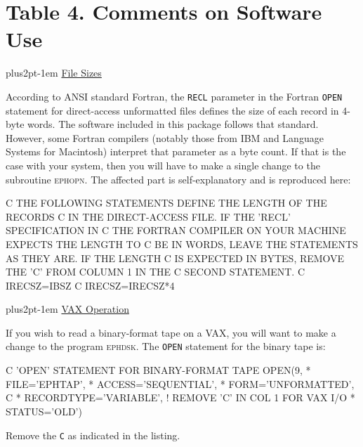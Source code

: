 \documentclass[twoside,11pt,nolof]{starlink}
\providecommand{\hdg}[1]{\vskip4pt plus2pt\leavevmode\kern-1em \underline{\large{#1}}\par}
\begin{document}
\section*{Table 4. Comments on Software Use}

\hdg{File Sizes}

According to ANSI standard Fortran, the \texttt{RECL} parameter in the
Fortran \texttt{OPEN} statement for direct-access
unformatted files defines the size of each record in 4-byte words.
The software included in this package follows that standard.
However, some Fortran compilers (notably those from IBM
and Language Systems for Macintosh) interpret that parameter as a
byte count. If that is the case with your system, then you will have
to make a single change to the subroutine \textsc{ephopn}.
The affected part is self-explanatory and is reproduced here:
\begin{terminalv}
        C       THE FOLLOWING STATEMENTS DEFINE THE LENGTH OF THE RECORDS
        C       IN THE DIRECT-ACCESS FILE. IF THE 'RECL' SPECIFICATION IN
        C       THE FORTRAN COMPILER ON YOUR MACHINE EXPECTS THE LENGTH TO
        C       BE IN WORDS, LEAVE THE STATEMENTS AS THEY ARE. IF THE LENGTH
        C       IS EXPECTED IN BYTES, REMOVE THE 'C' FROM COLUMN 1 IN THE
        C       SECOND STATEMENT.
        C
              IRECSZ=IBSZ
        C     IRECSZ=IRECSZ*4
\end{terminalv}

\hdg{VAX Operation}

If you wish to read a binary-format tape on a VAX, you will want to
make a change to the program \textsc{ephdsk}. The \texttt{OPEN} statement
for the binary tape is:
\begin{terminalv}
   C                        'OPEN' STATEMENT FOR BINARY-FORMAT TAPE
           OPEN(9,
        *       FILE='EPHTAP',
        *       ACCESS='SEQUENTIAL',
        *       FORM='UNFORMATTED',
   C    *       RECORDTYPE='VARIABLE', ! REMOVE 'C' IN COL 1 FOR VAX I/O
        *       STATUS='OLD')
\end{terminalv}
Remove the \texttt{C} as indicated in the listing.
\end{document}
